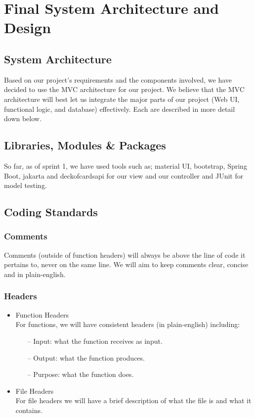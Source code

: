 \section{Final System Architecture and Design}

\subsection{System Architecture}
Based on our project's requirements and the components involved, we have decided to use the MVC architecture for our project. We believe that the MVC architecture will best let us integrate the major parts of our project (Web UI, functional logic, and database) effectively. Each are described in more detail down below. 

\subsection{Libraries, Modules \& Packages}
So far, as of sprint 1, we have used tools such as; material UI, bootstrap, Spring Boot, jakarta and deckofcardsapi for our view and our controller and JUnit for model testing.

\subsection{Coding Standards}
\subsubsection{Comments}
Comments (outside of function headers) will always be above the line of code it pertains to, never on the same line. We will aim to keep comments clear, concise and in plain-english.

\subsubsection{Headers}

\begin{itemize}
    \item Function Headers \\
    For functions, we will have consistent headers (in plain-english) including:
    \begin{itemize}
        \item [--] Input: what the function receives as input.
        \item [--] Output: what the function produces.
        \item [--] Purpose: what the function does.
    \end{itemize}

    \item File Headers \\
    For file headers we will have a brief description of what the file is and what it contains.
\end{itemize}

